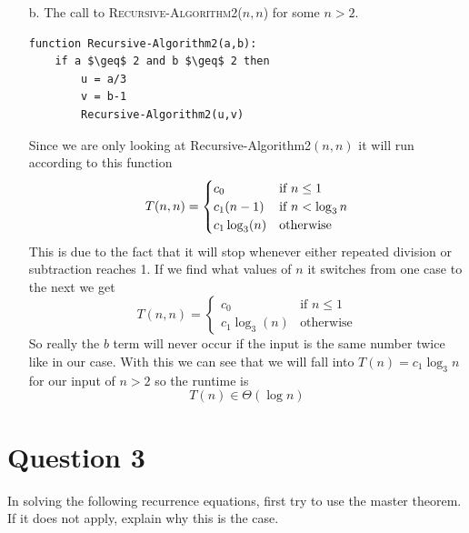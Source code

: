 \documentclass{article}
\begin{document}
\begin{itemize}
\item[b.] The call to \textsc{Recursive-Algorithm2}($n,n$) for some $n>2$.

\begin{lstlisting}
function Recursive-Algorithm2(a,b):
    if a $\geq$ 2 and b $\geq$ 2 then
        u = a/3
        v = b-1
        Recursive-Algorithm2(u,v)
\end{lstlisting}
Since we are only looking at Recursive-Algorithm2$(n,n)$ it will run according to this function
\begin{equation*}
T(n,n)=
\begin{cases}
c_{0} &\text{if $n \leq 1$}\\
c_{1}(n-1) &\text{if $ n < \log_{3}{n}$}\\
c_{1}\log_{3}(n) &\text{otherwise}
\end{cases}
\end{equation*}
This is due to the fact that it will stop whenever either repeated division or subtraction reaches 1.
If we find what values of $n$ it switches from one case to the next we get
\begin{equation*}
T(n,n)=
\begin{cases}
c_{0} &\text{if $n \leq 1$}\\
c_{1}\log_{3}(n) &\text{otherwise}
\end{cases}
\end{equation*}
So really the $b$ term will never occur if the input is the same number twice like in our case.
With this we can see that we will fall into $T(n)=c_{1}\log_{3}n$ for our input of $n>2$ so the runtime is
$$ T(n)\in \Theta(\log n) $$

\end{itemize}


\section*{Question 3}
In solving the following recurrence equations, first try to use the master theorem. If it does not apply, explain why this is the case.
\end{document}
